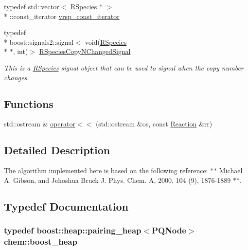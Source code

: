 \begin{DoxyCompactItemize}
typedef std\-::vector$<$ \hyperlink{classchem_1_1RSpecies}{R\-Species} $\ast$ $>$\\*
\-::const\-\_\-iterator \hyperlink{namespacechem_ab6ba36c9953625b15ff4105e1cdfdb86}{vrsp\-\_\-const\-\_\-iterator}
\item 
typedef \\*
boost\-::signals2\-::signal$<$ void(\hyperlink{classchem_1_1RSpecies}{R\-Species} \\*
$\ast$, int)$>$ \hyperlink{namespacechem_a09aea7e5a24368c13cd7d8d25b4d884e}{R\-Species\-Copy\-N\-Changed\-Signal}
\begin{DoxyCompactList}\small\item\em This is a \hyperlink{classchem_1_1RSpecies}{R\-Species} signal object that can be used to signal when the copy number changes. \end{DoxyCompactList}\end{DoxyCompactItemize}
\subsection*{Functions}
\begin{DoxyCompactItemize}
\item 
std\-::ostream \& \hyperlink{namespacechem_a33c82bc525c0bdd911d321e69eb06cc4}{operator$<$$<$} (std\-::ostream \&os, const \hyperlink{classchem_1_1Reaction}{Reaction} \&rr)
\end{DoxyCompactItemize}


\subsection{Detailed Description}
The algorithm implemented here is based on the following reference\-: $\ast$$\ast$ Michael A. Gibson, and Jehoshua Bruck J. Phys. Chem. A, 2000, 104 (9), 1876-\/1889 $\ast$$\ast$. 

\subsection{Typedef Documentation}
\hypertarget{namespacechem_aacd1d2bb93e0bb1b1af9bb1fbb5133ca}{
\subsubsection[{boost\-\_\-heap}]{\setlength{\rightskip}{0pt plus 5cm}typedef boost\-::heap\-::pairing\-\_\-heap$<${\bf P\-Q\-Node}$>$ {\bf chem\-::boost\-\_\-heap}}}\label{namespacechem_aacd1d2bb93e0bb1b1af9bb1fbb5133ca}


